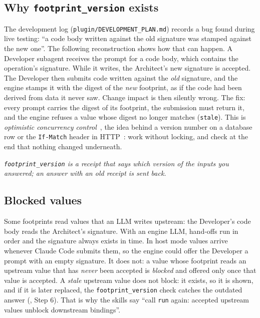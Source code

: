 \documentclass[10pt,a4paper]{article}
\newcommand{\cc}{Claude Code}
\newcommand{\code}[1]{\texttt{#1}}
\newcommand{\file}[1]{\texttt{#1}}
\newcommand{\mcptool}[1]{\texttt{#1}}
\newcounter{think}
\newcommand{\plain}[1]{\par\smallskip\noindent{\sffamily\bfseries\color{thinkbar}In plain words:}\enspace\emph{#1}\par\smallskip}
\begin{document}
\subsection{Why \code{footprint\_version} exists}

The development log (\file{plugin/DEVELOPMENT_PLAN.md}) records a bug found
during live testing: ``a code body written against the old signature was
stamped against the new one''. The following reconstruction shows how that
can happen. A Developer subagent receives the prompt for a code body, which
contains the operation's signature. While it writes, the Architect's new
signature is accepted. The Developer then submits code written against the
\emph{old} signature, and the engine stamps it with the digest of the
\emph{new} footprint, as if the code had been derived from data it never
saw. Change impact is then silently wrong. The fix: every prompt carries the
digest of its footprint, the submission must return it, and the engine
refuses a value whose digest no longer matches (\code{stale}). This is
\emph{optimistic concurrency control}~\cite{kung1981optimistic}, the idea
behind a version number on a database row or the \code{If-Match} header in
HTTP~\cite{rfc9110}: work without locking, and check at the end that nothing
changed underneath.

\plain{\code{footprint\_version} is a receipt that says which version of the
inputs you answered; an answer with an old receipt is sent back.}

\subsection{Blocked values}\label{sec:blocked}

Some footprints read values that an LLM writes upstream: the Developer's
code body reads the Architect's signature. With an engine LLM, hand-offs run
in order and the signature always exists in time. In host mode values arrive
whenever \cc{} submits them, so the engine could offer the Developer a
prompt with an empty signature. It does not: a value whose footprint reads
an upstream value that has \emph{never} been accepted is \emph{blocked} and
offered only once that value is accepted. A \emph{stale} upstream value does
not block: it exists, so it is shown, and if it is later replaced, the
\code{footprint\_version} check catches the outdated answer
(, Step 6). That is why the skills say ``call \mcptool{run}
again: accepted upstream values unblock downstream bindings''.
\end{document}
